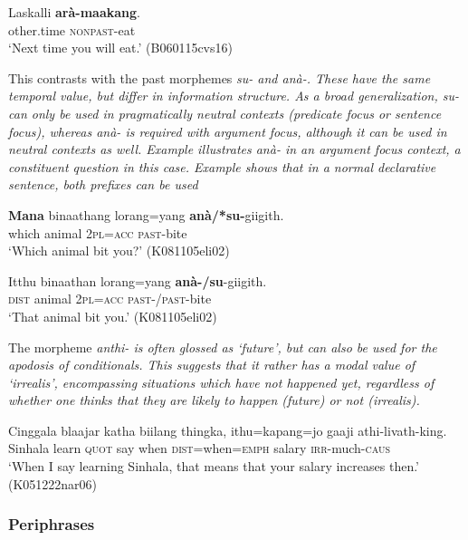 \ea \label{ex:ara:fut}
\gll Laskalli \textbf{arà-maakang}. \\
 other.time \textsc{nonpast}-eat\\
`Next time you will eat.' (B060115cvs16)
\z


This contrasts with the past morphemes \em su- \em and \em anà-\em. These have the same temporal value, but differ in information structure. As a broad generalization, \em su- \em can only be used in pragmatically neutral contexts (predicate focus or sentence focus), whereas \em anà- \em is required with argument focus, although it can be used in neutral contexts as well. Example  illustrates \em anà- \em  in an argument focus context, a constituent question in this case. Example  shows that in a normal declarative sentence, both prefixes can be used


\ea\label{ex:morph:v:ana:argfoc}
\gll \textbf{Mana} binaathang lorang=yang \textbf{anà/*su-}giigith. \\
     which animal 2\textsc{pl}=\textsc{acc} \textsc{past}-bite  \\
    `Which animal bit you?' (K081105eli02)
\z



\ea\label{ex:morph:v:ana:decl}
\gll Itthu binaathan lorang=yang \textbf{anà-/su}-giigith. \\
     \textsc{dist} animal 2\textsc{pl}=\textsc{acc} \textsc{past}-/\textsc{past}-bite  \\
    `That animal bit you.' (K081105eli02)
\z


The morpheme \em anthi- \em is often glossed as `future', but can also be used for the apodosis of conditionals. This suggests that it rather has a modal value of `irrealis', encompassing situations which have not happened yet, regardless of whether one thinks that they are likely to happen (future) or not (irrealis). 

\ea\label{ex:form:anthi:apod:nokalu}
\gll Cinggala blaajar katha biilang thingka, ithu=kapang=jo gaaji athi-livath-king. \\
     Sinhala learn \textsc{quot} say when \textsc{dist}=when=\textsc{emph} salary \textsc{irr}-much-\textsc{caus}  \\
    `When I say learning Sinhala, that means that your salary increases then.' (K051222nar06)
\z

\subsubsection{Periphrases}

